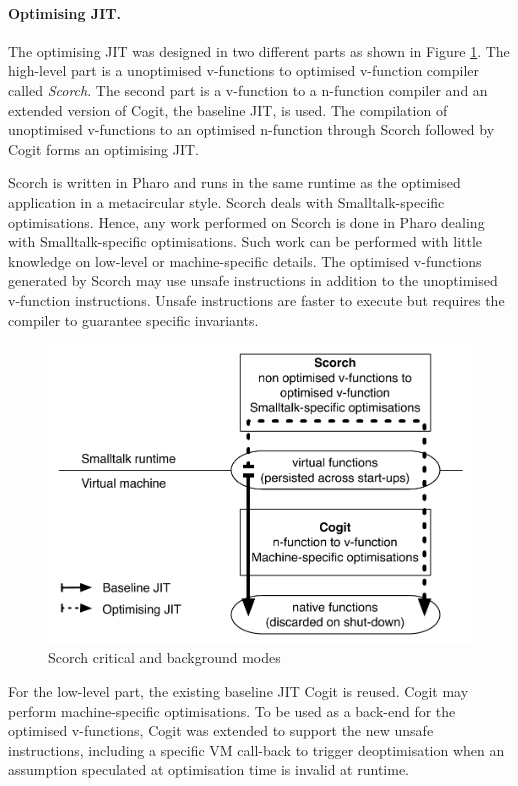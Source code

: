 \documentclass[a4paper,12pt,twoside]{../includes/ThesisStyle}
\begin{document}
\paragraph{Optimising JIT.}
The optimising JIT was designed in two different parts as shown in Figure \ref{fig:OptArchitecture}. The high-level part is a unoptimised v-functions to optimised v-function compiler called \emph{Scorch}. The second part is a v-function to a n-function compiler and an extended version of Cogit, the baseline JIT, is used. The compilation of unoptimised v-functions to an optimised n-function through Scorch followed by Cogit forms an optimising JIT.

Scorch is written in Pharo and runs in the same runtime as the optimised application in a metacircular style. Scorch deals with Smalltalk-specific optimisations. Hence, any work performed on Scorch is done in Pharo dealing with Smalltalk-specific optimisations. Such work can be performed with little knowledge on low-level or machine-specific details. The optimised v-functions generated by Scorch may use unsafe instructions in addition to the unoptimised v-function instructions. Unsafe instructions are faster to execute but requires the compiler to guarantee specific invariants.

\begin{figure}[h!]
    \begin{center}
        \includegraphics[width=0.8\linewidth]{OptArchitecture}
        \caption{Scorch critical and background modes}
        \label{fig:OptArchitecture}
    \end{center}
\end{figure}

For the low-level part, the existing baseline JIT Cogit is reused. Cogit may perform machine-specific optimisations. To be used as a back-end for the optimised v-functions, Cogit was extended to support the new unsafe instructions, including a specific VM call-back to trigger deoptimisation when an assumption speculated at optimisation time is invalid at runtime.
\end{document}

